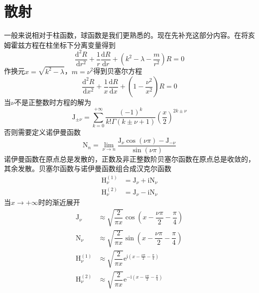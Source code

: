 \documentclass[12pt, a4paper, oneside]{ctexart}
\begin{document}
	\section{散射}
	一般来说相对于柱函数，球函数是我们更熟悉的。现在先补充这部分内容。在将亥姆霍兹方程在柱坐标下分离变量得到
	\begin{equation}
		\dfrac{\mathrm{d}^{2}R}{\mathrm{d}r^{2}}+\dfrac{1}{r}\dfrac{\mathrm{d}R}{\mathrm{d}r}+\left(k^{2}-\lambda-\dfrac{m}{r^{2}}\right)R=0
	\end{equation}
	\quad\quad 作换元$x=\sqrt{k^{2}-\lambda}$，$m=\nu^{2}$得到贝塞尔方程
	\begin{equation}
		\dfrac{\mathrm{d}^{2}R}{\mathrm{d}x^{2}}+\dfrac{1}{x}\dfrac{\mathrm{d}R}{\mathrm{d}x}+\left(1-\dfrac{\nu^{2}}{x^{2}}\right)R=0
	\end{equation}
	\quad\quad 当$\nu$不是正整数时方程的解为
	\begin{equation}
		\mathrm{J}_{\pm\nu}=\sum_{k=0}^{+\infty}\dfrac{\left(-1\right)^{k}}{k!\Gamma\left(k\pm\nu+1\right)}\left(\dfrac{x}{2}\right)^{2k\pm\nu}
	\end{equation}
	\quad\quad 否则需要定义诺伊曼函数
	\begin{equation}
		\mathrm{N}_{n}=\lim_{\nu\to n}\dfrac{\mathrm{J}_{\nu}\cos\left(\nu\pi\right)-\mathrm{J}_{-\nu}}{\sin\left(\nu\pi\right)}
	\end{equation}
	\quad\quad 诺伊曼函数在原点总是发散的，正数及非正整数阶贝塞尔函数在原点总是收敛的，其余发散。贝塞尔函数与诺伊曼函数组合成汉克尔函数
	\begin{align}
		\mathrm{H}_{\nu}^{\left(1\right)}&=\mathrm{J}_{\nu}+\mathrm{i}\mathrm{N}_{\nu}\\
		\mathrm{H}_{\nu}^{\left(2\right)}&=\mathrm{J}_{\nu}-\mathrm{i}\mathrm{N}_{\nu}
	\end{align}
	\quad\quad 当$x\to+\infty$时的渐近展开
	\begin{align}
		\mathrm{J}_{\nu}&\approx\sqrt{\dfrac{2}{\pi x}}\cos\left(x-\dfrac{\nu\pi}{2}-\dfrac{\pi}{4}\right)\\
		\mathrm{N}_{\nu}&\approx\sqrt{\dfrac{2}{\pi x}}\sin\left(x-\dfrac{\nu\pi}{2}-\dfrac{\pi}{4}\right)\\
		\mathrm{H}_{\nu}^{\left(1\right)}&\approx\sqrt{\dfrac{2}{\pi x}}\mathrm{e}^{\mathrm{i}\left(x-\frac{\nu\pi}{2}-\frac{\pi}{4}\right)}\\
		\mathrm{H}_{\nu}^{\left(2\right)}&\approx\sqrt{\dfrac{2}{\pi x}}\mathrm{e}^{-\mathrm{i}\left(x-\frac{\nu\pi}{2}-\frac{\pi}{4}\right)}
	\end{align}
\end{document}
